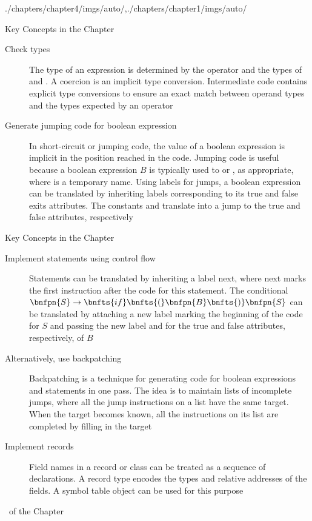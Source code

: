 \begin{graphicspathcontext}{{./chapters/chapter4/imgs/auto/},{./chapters/chapter1/imgs/auto/}}
\begin{bibunit}[apalike]
\begin{frame}{{Key Concepts} in the Chapter \insertcontinuationtext}
\begin{description}
	\item[Check types] The type of an expression  is determined by the operator  and the types of  and . A coercion is an implicit type conversion. Intermediate code contains explicit type conversions to ensure an exact match between operand types and the types expected by an operator
	\item[Generate jumping code for boolean expression] In short-circuit or jumping code, the value of a boolean expression is implicit in the position reached in the code. Jumping code is useful because a boolean expression $B$ is typically used to  or , as appropriate, where  is a temporary name. Using labels for jumps, a boolean expression can be translated by inheriting labels corresponding to its true and false exits attributes. The constants  and  translate into a jump to the true and false attributes, respectively
	\end{description}
\end{frame}

\begin{frame}{{Key Concepts} in the Chapter \insertcontinuationtext}
\begin{description}
	\item[Implement statements using control flow] Statements can be translated by inheriting a label next, where next marks the first instruction after the code for this statement. The conditional $\bnfpn{S} \bnfopo \bnfts{if} \bnfts{(} \bnfpn{B} \bnfts{)} \bnfpn{S}$ can be translated by attaching a new label marking the beginning of the code for $S$ and passing the new label and  for the true and false attributes, respectively, of $B$
	\item[Alternatively, use backpatching] Backpatching is a technique for generating code for boolean expressions and statements in one pass. The idea is to maintain lists of incomplete jumps, where all the jump instructions on a list have the same target. When the target becomes known, all the instructions on its list are completed by filling in the target
	\item[Implement records] Field names in a record or class can be treated as a sequence of declarations. A record type encodes the types and relative addresses of the fields. A symbol table object can be used for this purpose
	\end{description}
\end{frame}

\begin{frame}[t,fancyframetitle=false,allowframebreaks]{\bibname\ of the Chapter}%
	\tiny%
\end{frame}%

\end{bibunit}
\end{graphicspathcontext}

\endinput
